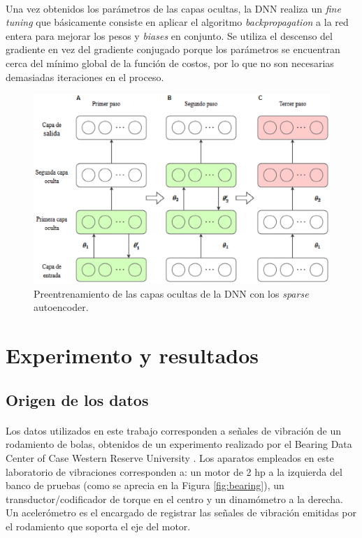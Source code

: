 \documentclass[12pt]{article}
\begin{document}
\paragraph{}
Una vez obtenidos los parámetros de las capas ocultas, la DNN realiza un \textit{fine tuning} que básicamente consiste en aplicar el algoritmo \textit{backpropagation} a la red entera para mejorar los pesos y \textit{biases} en conjunto. Se utiliza el descenso del gradiente en vez del gradiente conjugado porque los parámetros se encuentran cerca del mínimo global de la función de costos, por lo que no son necesarias demasiadas iteraciones en el proceso.

\begin{figure}[ht]
  \centering
    \includegraphics[scale=0.9]{./training.eps}
  \caption{Preentrenamiento de las capas ocultas de la DNN con los \textit{sparse} autoencoder.}
  \label{fig:deepnet}
\end{figure}

\section{Experimento y resultados}
\subsection{Origen de los datos}
\paragraph{}
Los datos utilizados en este trabajo corresponden a señales de vibración de un rodamiento de bolas, obtenidos de un experimento realizado por el Bearing Data Center of Case Western Reserve University \cite{case}. Los aparatos empleados en este laboratorio de vibraciones corresponden a: un motor de 2 hp a la izquierda del banco de pruebas (como se aprecia en la Figura \ref{fig:bearing}), un transductor/codificador de torque en el centro y un dinamómetro a la derecha. Un acelerómetro es el encargado de registrar las señales de vibración emitidas por el rodamiento que soporta el eje del motor.
\end{document}
